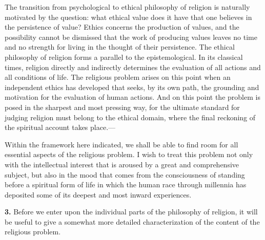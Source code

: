 \documentclass[12pt,a4paper]{book}
\begin{document}
The transition from psychological to ethical philosophy of religion is
naturally motivated by the question: what ethical value does it have
that one believes in the persistence of value? Ethics concerns the
production of values, and the possibility cannot be dismissed that the
work of producing values leaves no time and no strength for living in
the thought of their persistence. The ethical philosophy of religion
forms a parallel to the epistemological. In its classical times,
religion directly and indirectly determines the evaluation of all
actions and all conditions of life. The religious problem arises on this
point when an independent ethics has developed that seeks, by its own
path, the grounding and motivation for the evaluation of human actions.
And on this point the problem is posed in the sharpest and most pressing
way, for the ultimate standard for judging religion must belong to the
ethical domain, where the final reckoning of the spiritual account takes
place.---

Within the framework here indicated, we shall be able to find room for
all essential aspects of the religious problem. I wish to treat this
problem not only with the intellectual interest that is aroused by a
great and comprehensive subject, but also in the mood that comes from
the consciousness of standing before a spiritual form of life in which
the human race through millennia has deposited some of its deepest and
most inward experiences.

\medskip

\noindent\textbf{3.} Before we enter upon the individual parts of the
philosophy of religion, it will be useful to give a somewhat more
detailed characterization of the content of the religious problem.
\end{document}

